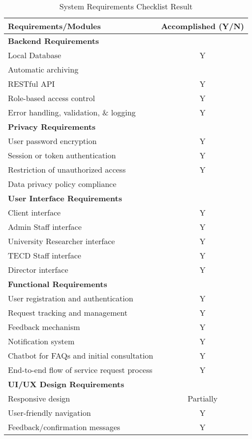 \begin{table}[ht]
	\centering
	\begin{tabular}{|p{10cm}|c|}
		\hline
		\textbf{Requirements/Modules} & \textbf{Accomplished (Y/N)} \\
		\hline
		\multicolumn{2}{|l|}{\textbf{Backend Requirements}} \\
		\hline
		Local Database & Y \\
		Automatic archiving & \\
		RESTful API & Y \\
		Role-based access control & Y \\
		Error handling, validation, \& logging & Y \\
		\hline
		\multicolumn{2}{|l|}{\textbf{Privacy Requirements}} \\
		\hline
		User password encryption & Y \\
		Session or token authentication & Y \\
		Restriction of unauthorized access & Y \\
		Data privacy policy compliance & \\
		\hline
		\multicolumn{2}{|l|}{\textbf{User Interface Requirements}} \\
		\hline
		Client interface & Y \\
		Admin Staff interface & Y \\
		University Researcher interface & Y \\
		TECD Staff interface & Y \\
		Director interface & Y \\
		\hline
		\multicolumn{2}{|l|}{\textbf{Functional Requirements}} \\
		\hline
		User registration and authentication & Y \\
		Request tracking and management & Y \\
		Feedback mechanism & Y \\
		Notification system & Y \\
		Chatbot for FAQs and initial consultation & Y \\
		End-to-end flow of service request process & Y \\
		\hline
		\multicolumn{2}{|l|}{\textbf{UI/UX Design Requirements}} \\
		\hline
		Responsive design & Partially \\
		User-friendly navigation & Y \\
		Feedback/confirmation messages & Y \\
		\hline
	\end{tabular}
	\caption{System Requirements Checklist Result}
	\label{tab:summary_results}
\end{table}